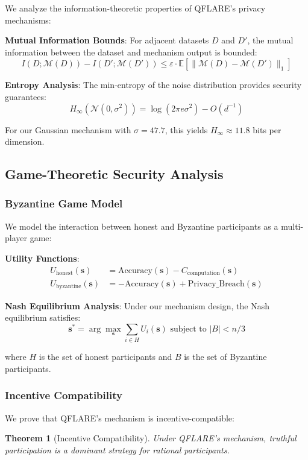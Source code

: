 \documentclass[journal,onecolumn]{IEEEtran}
\newtheorem{theorem}{Theorem}
\begin{document}
We analyze the information-theoretic properties of QFLARE's privacy mechanisms:

\textbf{Mutual Information Bounds}:
For adjacent datasets $D$ and $D'$, the mutual information between the dataset and mechanism output is bounded:
$$I(D; \mathcal{M}(D)) - I(D'; \mathcal{M}(D')) \leq \varepsilon \cdot \mathbb{E}[\|\mathcal{M}(D) - \mathcal{M}(D')\|_1]$$

\textbf{Entropy Analysis}:
The min-entropy of the noise distribution provides security guarantees:
$$H_\infty(\mathcal{N}(0, \sigma^2)) = \log(2\pi e \sigma^2) - O(d^{-1})$$

For our Gaussian mechanism with $\sigma = 47.7$, this yields $H_\infty \approx 11.8$ bits per dimension.

\subsection{Game-Theoretic Security Analysis}

\subsubsection{Byzantine Game Model}

We model the interaction between honest and Byzantine participants as a multi-player game:

\textbf{Utility Functions}:
\begin{align}
U_{\text{honest}}(\mathbf{s}) &= \text{Accuracy}(\mathbf{s}) - C_{\text{computation}}(\mathbf{s}) \\
U_{\text{byzantine}}(\mathbf{s}) &= -\text{Accuracy}(\mathbf{s}) + \text{Privacy\_Breach}(\mathbf{s})
\end{align}

\textbf{Nash Equilibrium Analysis}:
Under our mechanism design, the Nash equilibrium satisfies:
$$\mathbf{s}^* = \arg\max_{\mathbf{s}} \sum_{i \in H} U_i(\mathbf{s}) \text{ subject to } |B| < n/3$$

where $H$ is the set of honest participants and $B$ is the set of Byzantine participants.

\subsubsection{Incentive Compatibility}

We prove that QFLARE's mechanism is incentive-compatible:

\begin{theorem}[Incentive Compatibility]
Under QFLARE's mechanism, truthful participation is a dominant strategy for rational participants.
\end{theorem}
\end{document}
